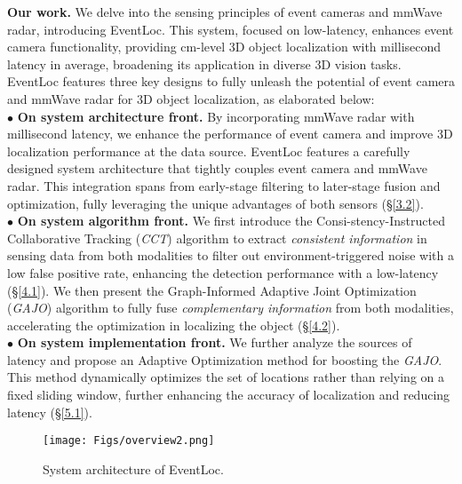 \noindent \textbf{Our work.}
We delve into the sensing principles of event cameras and mmWave radar, introducing EventLoc. This system, focused on low-latency, enhances event camera functionality, providing cm-level 3D object localization with millisecond latency in average, broadening its application in diverse 3D vision tasks.
EventLoc features three key designs to fully unleash the potential of event camera and mmWave radar for 3D object localization, as elaborated below: \\
\noindent $\bullet$ \textbf{On system architecture front.}
By incorporating mmWave radar with millisecond latency, we enhance the performance of event camera and improve 3D localization performance at the data source.
EventLoc features a carefully designed system architecture that tightly couples event camera and mmWave radar. 
This integration spans from early-stage filtering to later-stage fusion and optimization, fully leveraging the unique advantages of both sensors (§\ref{3.2}). \\
\noindent $\bullet$ \textbf{On system algorithm front.}
We first introduce the Consi-stency-Instructed Collaborative Tracking (\textit{CCT}) algorithm to extract \textit{consistent information} in sensing data from both modalities to filter out environment-triggered noise with a low false positive rate, enhancing the detection performance with a low-latency (§\ref{4.1}). 
We then present the Graph-Informed Adaptive Joint Optimization (\textit{GAJO}) algorithm to fully fuse \textit{complementary information} from both modalities, accelerating the optimization in localizing the object (§\ref{4.2}). \\
\noindent $\bullet$ \textbf{On system implementation front.}
We further analyze the sources of latency and propose an Adaptive Optimization method for boosting the \textit{GAJO}. 
This method dynamically optimizes the set of locations rather than relying on a fixed sliding window, further enhancing the accuracy of localization and reducing latency (§\ref{5.1}).

\begin{figure*}[t]
    \setlength{\abovecaptionskip}{0.4cm} %
    \setlength{\belowcaptionskip}{-0.5cm}
    \setlength{\subfigcapskip}{-0.25cm}
    \centering
        \texttt{[image: Figs/overview2.png]}
        \vspace{-0.2cm}
    \caption{System architecture of EventLoc.}
    \label{overview}
\end{figure*} 


